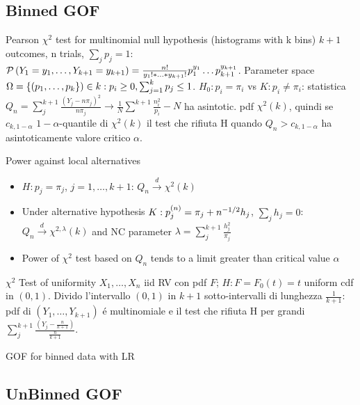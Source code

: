 \subsection{Binned GOF}\label{binnedgof}

\begin{frame}{Pearson $\chi^2$ test for multinomial null hypothesis (histograms with k bins)}
$k+1$ outcomes, n trials, $\sum_jp_j=1$: $\operatorname{\mathcal{P}}{(Y_1=y_1,\ldots,Y_{k+1}=y_{k+1})}=\frac{n!}{y_1!*\ldots*y_{k+1}!}p_1^{y_1}\ldots p_{k+1}^{y_{k+1}}$. Parameter space $\Omega=\{(p_1,\ldots,p_k\})\in \real{k}: p_i\geq0,\sum_{j=1}^kp_j\leq1$.
$H_0: p_i=\pi_i$ vs $K: p_i\neq\pi_i$:
statistica $Q_n=\sum_j^{k+1}\frac{(Y_j-n\pi_j)^2}{n\pi_j}\to\frac{1}{N}\sum^{k+1}\frac{n_i^2}{p_i}-N$ ha asintotic. pdf $\chi^2(k)$, quindi se $c_{k,1-\alpha}$ $1-\alpha$-quantile di $\chi^2(k)$ il test che rifiuta H quando $Q_n>c_{k,1-\alpha}$ ha asintoticamente valore critico $\alpha$.
\begin{block}{Power against local alternatives}
	\begin{itemize}
		\item $H: p_j=\pi_j$, $j=1,\ldots,k+1$: $Q_n\xrightarrow{d}\chi^2(k)$
		\item Under alternative hypothesis $K: p_j^{(n)}=\pi_j+n^{-1/2}h_j$, $\sum_jh_j=0$: $Q_n\xrightarrow{d}\chi^{2,\lambda}(k)$ and NC parameter $\lambda=\sum_j^{k+1}\frac{h_j^2}{\pi_j}$
		\item Power of $\chi^2$ test based on $Q_n$ tends to a limit greater than critical value $\alpha$
	\end{itemize}
\end{block}
\end{frame}

\begin{frame}{$\chi^2$ Test of uniformity}
$X_1,\ldots,X_n$ iid RV con pdf $F$; $H: F=F_0(t)=t$ uniform cdf in $(0,1)$. Divido l'intervallo $(0,1)$ in $k+1$ sotto-intervalli di lunghezza $\frac{1}{k+1}$: pdf di $(Y_1,\ldots,Y_{k+1})$ \'e multinomiale e il test che rifiuta H per grandi $\sum_j^{k+1}\frac{(Y_j-\frac{n}{k+1})}{\frac{n}{k+1}}$.
\end{frame}



\begin{frame}{GOF for binned data with LR}

\end{frame}

\subsection{UnBinned GOF}\label{unbinnedgof}

